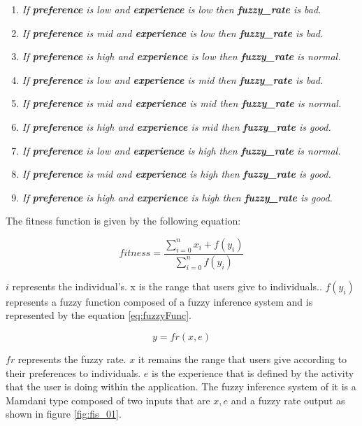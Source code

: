 \begin{enumerate}
	\item \textit{If \textbf{preference} is low and
		\textbf{experience} is low then \textbf{fuzzy\_rate} is bad.}
	\item \textit{If \textbf{preference} is mid and
		\textbf{experience} is low  then \textbf{fuzzy\_rate} is bad.}
	\item \textit{If \textbf{preference} is high and
		\textbf{experience} is low  then \textbf{fuzzy\_rate} is normal.}
	\item \textit{If \textbf{preference} is low and
		\textbf{experience} is mid then \textbf{fuzzy\_rate} is bad.}
	\item \textit{If \textbf{preference} is mid and
		\textbf{experience} is mid  then \textbf{fuzzy\_rate} is normal.}
	\item \textit{If \textbf{preference} is high and
		\textbf{experience} is mid  then \textbf{fuzzy\_rate} is good.}
	\item \textit{If \textbf{preference} is low and
		\textbf{experience} is high then \textbf{fuzzy\_rate} is normal.}
	\item \textit{If \textbf{preference} is mid and
		\textbf{experience} is high  then \textbf{fuzzy\_rate} is good.}
	\item \textit{If \textbf{preference} is high and
		\textbf{experience} is high  then \textbf{fuzzy\_rate} is good.}

\end{enumerate}

The fitness function is given by the following equation:

\begin{equation}\label{eq:fitfunc02}
\displaystyle fitness=\frac{\sum_{i=0}^{n}x_{i}+f(y_{i})}{\sum_{i=0}^{n}f(y_{i})}
\end{equation}

$i$ represents the individual's. x is the range that users give to individuals..
$f(y_i)$ represents a fuzzy function composed of a fuzzy inference system and is
represented by the equation \ref{eq:fuzzyFunc}.

\begin{equation}\label{eq:fuzzyFunc}
\displaystyle y=fr(x,e)
\end{equation}


$fr$ represents the fuzzy rate. $x$ it remains the range that users give
according to their preferences to individuals. $e$  is the experience that is
defined by the activity that the user is doing within the application. The fuzzy
inference system of it is a Mamdani type composed of two inputs that are  $x,e$
and a fuzzy rate output as shown in figure \ref{fig:fis_01}.

